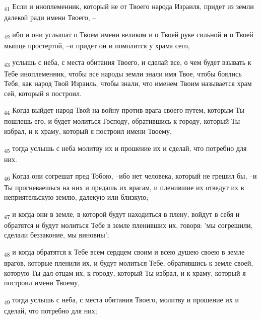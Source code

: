 \begin{tcolorbox}
\textsubscript{41} Если и иноплеменник, который не от Твоего народа Израиля, придет из земли далекой ради имени Твоего, --
\end{tcolorbox}
\begin{tcolorbox}
\textsubscript{42} ибо и они услышат о Твоем имени великом и о Твоей руке сильной и о Твоей мышце простертой, --и придет он и помолится у храма сего,
\end{tcolorbox}
\begin{tcolorbox}
\textsubscript{43} услышь с неба, с места обитания Твоего, и сделай все, о чем будет взывать к Тебе иноплеменник, чтобы все народы земли знали имя Твое, чтобы боялись Тебя, как народ Твой Израиль, чтобы знали, что именем Твоим называется храм сей, который я построил.
\end{tcolorbox}
\begin{tcolorbox}
\textsubscript{44} Когда выйдет народ Твой на войну против врага своего путем, которым Ты пошлешь его, и будет молиться Господу, обратившись к городу, который Ты избрал, и к храму, который я построил имени Твоему,
\end{tcolorbox}
\begin{tcolorbox}
\textsubscript{45} тогда услышь с неба молитву их и прошение их и сделай, что потребно для них.
\end{tcolorbox}
\begin{tcolorbox}
\textsubscript{46} Когда они согрешат пред Тобою, --ибо нет человека, который не грешил бы, --и Ты прогневаешься на них и предашь их врагам, и пленившие их отведут их в неприятельскую землю, далекую или близкую;
\end{tcolorbox}
\begin{tcolorbox}
\textsubscript{47} и когда они в земле, в которой будут находиться в плену, войдут в себя и обратятся и будут молиться Тебе в земле пленивших их, говоря: 'мы согрешили, сделали беззаконие, мы виновны';
\end{tcolorbox}
\begin{tcolorbox}
\textsubscript{48} и когда обратятся к Тебе всем сердцем своим и всею душею своею в земле врагов, которые пленили их, и будут молиться Тебе, обратившись к земле своей, которую Ты дал отцам их, к городу, который Ты избрал, и к храму, который я построил имени Твоему,
\end{tcolorbox}
\begin{tcolorbox}
\textsubscript{49} тогда услышь с неба, с места обитания Твоего, молитву и прошение их и сделай, что потребно для них;
\end{tcolorbox}
